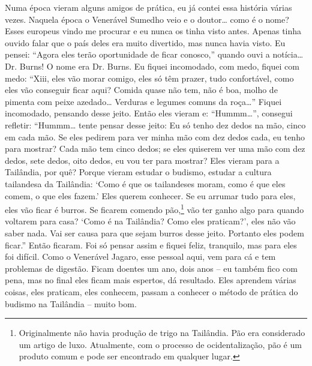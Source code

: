 Numa época vieram alguns amigos de prática, eu já contei essa
história várias vezes. Naquela época o Venerável Sumedho veio e o
doutor… como é o nome? Esses europeus vindo me procurar e eu nunca os
tinha visto antes. Apenas tinha ouvido falar que o país deles era muito
divertido, mas nunca havia visto. Eu pensei: “Agora eles terão
oportunidade de ficar conosco,” quando ouvi a notícia… Dr. Burns! O
nome era Dr. Burns. Eu fiquei incomodado, com medo, fiquei com medo:
“Xiii, eles vão morar comigo, eles só têm prazer, tudo confortável,
como eles vão conseguir ficar aqui? Comida quase não tem, não é boa,
molho de pimenta com peixe azedado… Verduras e legumes comuns da roça…”
Fiquei incomodado, pensando desse jeito. Então eles vieram e: “Hummm…”,
consegui refletir: “Hummm… tente pensar desse jeito: Eu só tenho dez
dedos na mão, cinco em cada mão. Se eles pedirem para ver minha mão com
dez dedos cada, eu tenho para mostrar? Cada mão tem cinco dedos; se
eles quiserem ver uma mão com dez dedos, sete dedos, oito dedos, eu vou
ter para mostrar? Eles vieram para a Tailândia, por quê? Porque vieram
estudar o budismo, estudar a cultura tailandesa da Tailândia: ‘Como é
que os tailandeses moram, como é que eles comem, o que eles fazem.’
Eles querem conhecer. Se eu arrumar tudo para eles, eles vão ficar é
burros. Se ficarem comendo pão,\footnote{Originalmente não havia
produção de trigo na Tailândia. Pão era considerado um artigo de luxo.
Atualmente, com o processo de ocidentalização, pão é um produto comum e
pode ser encontrado em qualquer lugar.} vão ter ganho algo para quando
voltarem para casa? ‘Como é na Tailândia? Como eles praticam?’, eles
não vão saber nada. Vai ser causa para que sejam burros desse jeito.
Portanto eles podem ficar.” Então ficaram. Foi só pensar assim e fiquei
feliz, tranquilo, mas para eles foi difícil. Como o Venerável Jagaro,
esse pessoal aqui, vem para cá e tem problemas de digestão. Ficam
doentes um ano, dois anos – eu também fico com pena, mas no final eles
ficam mais espertos, dá resultado. Eles aprendem várias coisas, eles
praticam, eles conhecem, passam a conhecer o método de prática do
budismo na Tailândia – muito bom. 


